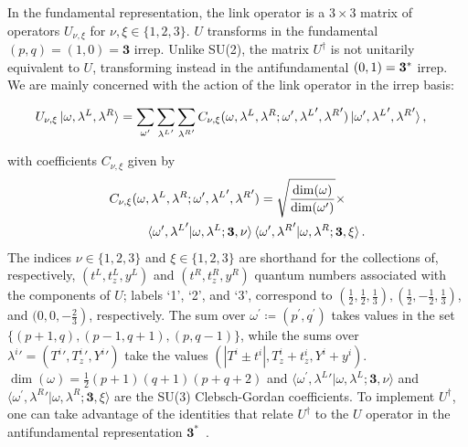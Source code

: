\documentclass[aps,prd,twocolumn,showpacs,groupedaddress,superscriptaddress,nofootinbib,floatfix,preprintnumbers,longbibliography]{revtex4-1}
\begin{document}
In the fundamental representation, the link operator is a $3\times3$ matrix of operators $U_{\nu ,\xi}$ for $\nu,\xi \in \{1,2,3\}$. $U$ transforms in the fundamental $(p,q)=(1,0)=\mathbf{3}$ irrep. Unlike SU(2), the matrix $U^\dagger$ is not unitarily equivalent to $U$, transforming instead in the antifundamental $(0,1)={\bf 3}^{* }$ irrep. We are mainly concerned with the action of the link operator in the irrep basis: 
%
\begin{widetext}
\begin{align}
    U_{\nu,\xi} & \ket{\omega, \lambda^L, \lambda^R} = 
    \sum_{\omega'}
    \sum_{{\lambda^L}'} \sum_{{\lambda^R}'} C_{\nu,\xi}(\omega, \lambda^L , \lambda^R ;
    \omega',{\lambda^L}' , {\lambda^R}' ) \ket{\omega', {\lambda^L}', {\lambda^R}'},
    \label{eq:SU(3)-link}
\end{align}
\end{widetext}
%
with coefficients $C_{\nu,\xi}$ given by
%
\begin{align}
    &C_{\nu,\xi}(\omega, \lambda^L , \lambda^R ;
    \omega', {\lambda^L}' , {\lambda^R}' )  =\sqrt{\frac{\dim (\omega)}{\dim (\omega')}} \times
    \nonumber\\
    & \hspace{1 cm} \braket{\omega', {\lambda^L}' | \omega, \lambda^L ; \mathbf{3} , \nu} \braket{\omega', {\lambda^R}' | \omega, \lambda^R ; \mathbf{3}, \xi} .
    \label{eq:SU(3)-coefficients}
\end{align}
%
The indices $\nu \in \{1,2,3\}$ and $\xi \in \{1,2,3\}$ are shorthand for the collections of, respectively, $(t^{L}, t^{L}_z ,y^{L})$ and $(t^{R}, t^{R}_z ,y^{R})$ quantum numbers associated with the components of $U$; labels `1', `2', and `3', correspond to $\left(\frac{1}{2}, \frac{1}{2}, \frac{1}{3}\right),\left(\frac{1}{2},-\frac{1}{2}, \frac{1}{3}\right)$, and $\left.(0,0,-\frac{2}{3}\right)$, respectively. The sum over $\omega^{\prime} \coloneq \left(p^{\prime},q^{\prime}\right)$ takes values in the set $\{(p+1, q),(p-1, q+1),(p, q-1)\}$, while the sums over ${\lambda^{i}}'=({T^i}',{T^{i}_z}',{Y^i}')$ take the values $(\left|T^{i}\pm t^{i}\right|,T^{i}_z + t^{i}_z,Y^i + y^i)$. $\operatorname{dim}(\omega)=\frac{1}{2}(p+1)(q+1)(p+q+2)$ and $\langle\omega^{\prime}, {\lambda^{L}}' | \omega, \lambda^{L} ; \mathbf{3}, \nu\rangle$ and $\langle\omega^{\prime}, {\lambda^{R}}' | \omega, \lambda^{R} ; \mathbf{3}, \xi\rangle$ are the SU(3) Clebsch-Gordan coefficients. To implement $U^\dagger$, one can take advantage of the identities that relate $U^\dagger$ to the $U$ operator in the antifundamental representation $\bm{3}^*$~\cite{deSwart:1963pdg,Byrnes:2005qx,Balaji:2025afl}.
\end{document}
